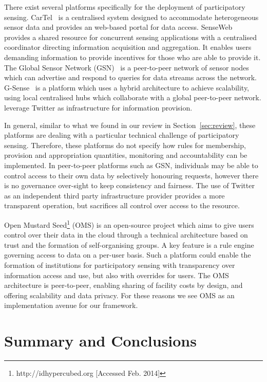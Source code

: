 There exist several platforms specifically for the deployment of participatory sensing. 
CarTel~\citep{Hull2006} is a centralised system designed to accommodate heterogeneous sensor data and provides an web-based portal for data access. 
SenseWeb~\citep{Kansal2007} provides a shared resource for concurrent sensing applications with a centralised coordinator directing information acquisition and aggregation. 
It enables users demanding information to provide incentives for those who are able to provide it. 
The Global Sensor Network (GSN)~\citep{Aberer2006} is a peer-to-peer network of sensor nodes which can advertise and respond to queries for data streams across the network. 
G-Sense~\citep{Perez2010} is a platform which uses a hybrid architecture to achieve scalability, using local centralised hubs which collaborate with a global peer-to-peer network. 
 leverage Twitter as infrastructure for information provision.

In general, similar to what we found in our review in Section~\ref{sec:review}, these platforms are dealing with a particular technical challenge of participatory sensing. 
Therefore, these platforms do not specify how rules for membership, provision and appropriation quantities, monitoring and accountability can be implemented. 
In peer-to-peer platforms such as GSN, individuals may be able to control access to their own data by selectively honouring requests, however there is no governance over-sight to keep consistency and fairness. 
The use of Twitter as an independent third party infrastructure provider provides a more transparent operation, but sacrifices all control over access to the resource.

Open Mustard Seed\footnote{http://idhypercubed.org [Accessed Feb. 2014]} (OMS) is an open-source project which aims to give users control over their data in the cloud through a technical architecture based on trust and the formation of self-organising groups. 
A key feature is a rule engine governing access to data on a per-user basis. 
Such a platform could enable the formation of institutions for participatory sensing with transparency over information access and use, but also with overrides for users. 
The OMS architecture is peer-to-peer, enabling sharing of facility costs by design, and offering scalability and data privacy. 
For these reasons we see OMS as an implementation avenue for our framework.

\section{Summary and Conclusions}\label{sec:conclude}

